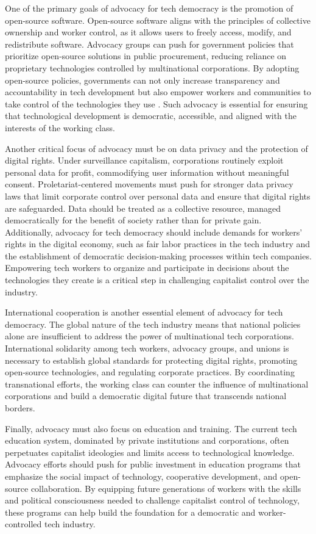 \begin{refsection}
One of the primary goals of advocacy for tech democracy is the promotion of open-source software. Open-source software aligns with the principles of collective ownership and worker control, as it allows users to freely access, modify, and redistribute software. Advocacy groups can push for government policies that prioritize open-source solutions in public procurement, reducing reliance on proprietary technologies controlled by multinational corporations. By adopting open-source policies, governments can not only increase transparency and accountability in tech development but also empower workers and communities to take control of the technologies they use \cite[pp.~150]{feller_open_source_software_policy}. Such advocacy is essential for ensuring that technological development is democratic, accessible, and aligned with the interests of the working class.

Another critical focus of advocacy must be on data privacy and the protection of digital rights. Under surveillance capitalism, corporations routinely exploit personal data for profit, commodifying user information without meaningful consent. Proletariat-centered movements must push for stronger data privacy laws that limit corporate control over personal data and ensure that digital rights are safeguarded. Data should be treated as a collective resource, managed democratically for the benefit of society rather than for private gain. Additionally, advocacy for tech democracy should include demands for workers' rights in the digital economy, such as fair labor practices in the tech industry and the establishment of democratic decision-making processes within tech companies. Empowering tech workers to organize and participate in decisions about the technologies they create is a critical step in challenging capitalist control over the industry.

International cooperation is another essential element of advocacy for tech democracy. The global nature of the tech industry means that national policies alone are insufficient to address the power of multinational tech corporations. International solidarity among tech workers, advocacy groups, and unions is necessary to establish global standards for protecting digital rights, promoting open-source technologies, and regulating corporate practices. By coordinating transnational efforts, the working class can counter the influence of multinational corporations and build a democratic digital future that transcends national borders.

Finally, advocacy must also focus on education and training. The current tech education system, dominated by private institutions and corporations, often perpetuates capitalist ideologies and limits access to technological knowledge. Advocacy efforts should push for public investment in education programs that emphasize the social impact of technology, cooperative development, and open-source collaboration. By equipping future generations of workers with the skills and political consciousness needed to challenge capitalist control of technology, these programs can help build the foundation for a democratic and worker-controlled tech industry.


\end{refsection}
